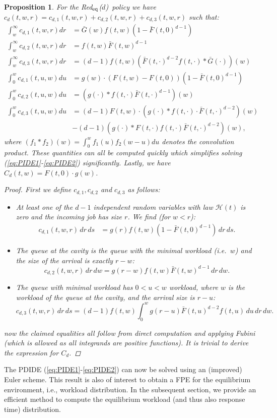 \documentclass[12pt]{report}
\newcommand{\Redid}{Red$_{\textup{eq}}$($d$)}
\newtheorem{proposition}[theorem]{Proposition}
\begin{document}
\begin{proposition}\label{prop:c_d}
For the \Redid\ policy we have $c_d(t,w,r)=c_{d,1}(t,w,r) + c_{d,2}(t,w,r) + c_{d,3}(t,w,r)$ such that:
\begin{align}
\int_w^\infty c_{d,1}(t,w,r)dr &= \bar{G}(w) f(t,w)(1-\bar{F}(t,0)^{d-1})\label{cd1}\\
\int_w^\infty c_{d,2}(t,w,r)dr &= f(t,w) \bar{F}(t,w)^{d-1}\label{cd2}\\
\int_w^\infty c_{d,3}(t,w,r)dr &= (d-1) f(t,w) \left(\bar{F}(t,\cdot)^{d-2} f(t,\cdot) * \bar{G}(\cdot)\right)(w)\label{cd3}\\
\int_0^w c_{d,1}(t,u,w) du &= g(w) \cdot (F(t,w) - F(t,0)) (1 - \bar{F}(t,0)^{d-1})\nonumber\\
\int_0^w c_{d,2}(t,u,w) du &= \left(g(\cdot) * f(t,\cdot)\bar{F}(t,\cdot)^{d-1}\right)(w)\nonumber\\
\int_0^w c_{d,3}(t,u,w) du &=
(d-1) F(t,w) \cdot \left(g(\cdot) * f(t,\cdot) \cdot \bar{F}(t,\cdot)^{d-2}\right)(w)\nonumber\\
&- (d-1) \left(g(\cdot) * F(t,\cdot) f(t,\cdot) \bar{F}(t,\cdot)^{d-2}\right)(w),\nonumber
\end{align}
where $(f_1*f_2)(w) = \int_0^w f_1(u) f_2(w-u) du$ denotes the convolution product. These quantities can all be computed quickly which simplifies solving (\ref{eq:PIDE1}-\ref{eq:PIDE2}) significantly. Lastly, we have $C_d(t,w)=F(t,0) \cdot g(w)$.
\begin{proof}
First we define $c_{d,1},c_{d,2}$ and $c_{d,3}$ as follows:
\begin{itemize}
\item At least one of the $d-1$ independent random variables with law $\mathcal{H}(t)$ is zero and the incoming job has size $r$. We find (for $w < r$):
\begin{align*}
c_{d,1}(t,w,r)\, dr\, ds &= g(r) f(t,w)(1-\bar{F}(t,0)^{d-1})\, dr\, ds.
\end{align*}
\item The queue at the cavity is the queue with the minimal workload (i.e.~$w$) and the size of the arrival is exactly $r-w$:
$$
c_{d,2}(t,w,r)\, dr\, dw = g(r-w) f(t,w) \bar{F}(t,w)^{d-1} \, dr\, dw.
$$
\item The queue with minimal workload has $0 < u < w$ workload, where $w$ is the workload of the queue
at the cavity, and the arrival size is $r-u$:
$$
c_{d,3}(t,w,r)\, dr\, ds = (d-1)f(t,w) \int_0^w g(r-u) \bar{F}(t,u)^{d-2}f(t,u) \,du\,dr\,dw.
$$
\end{itemize}
now the claimed equalities all follow from direct computation and applying Fubini (which is allowed as all integrands are positive functions). It is trivial to derive the expression for $C_d$.
\end{proof}
\end{proposition}
The PDIDE (\ref{eq:PIDE1}-\ref{eq:PIDE2}) can now be solved using an (improved) Euler scheme.  This result is also of interest to obtain 
a FPE for the equilibrium environment, i.e., workload distribution. 
In the subsequent section, we provide an efficient method to compute the equilibrium workload (and thus also response time) distribution.
\end{document}
